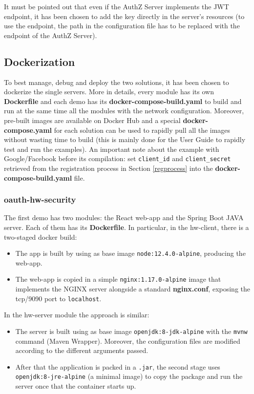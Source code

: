 \documentclass[a4paper,12pt]{article}
\begin{document}
It must be pointed out that even if the AuthZ Server implements the JWT endpoint, it has been chosen to add the key directly in the server's resources (to use the endpoint, the path in the configuration file has to be replaced with the endpoint of the AuthZ Server).

\subsection{Dockerization}
To best manage, debug and deploy the two solutions, it has been chosen to dockerize the single servers. More in details, every module has its own \textbf{Dockerfile} and each demo has its \textbf{docker-compose-build.yaml} to build and run at the same time all the modules with the network configuration. Moreover, pre-built images are available on Docker Hub and a special \textbf{docker-compose.yaml} for each solution can be used to rapidly pull all the images without wasting time to build (this is mainly done for the User Guide to rapidly test and run the examples).
An important note about the example with Google/Facebook before its compilation: set \texttt{client\_id} and \texttt{client\_secret} retrieved from the registration process in Section \ref{regprocess} into the \textbf{docker-compose-build.yaml} file.

\subsubsection{oauth-hw-security}
The first demo has two modules: the React web-app and the Spring Boot JAVA server. Each of them has its \textbf{Dockerfile}. In particular, in the hw-client, there is a two-staged docker build:

\begin{itemize}
    \item The app is built by using as base image \texttt{node:12.4.0-alpine}, producing the web-app.
    \item The web-app is copied in a simple \texttt{nginx:1.17.0-alpine} image that implements the NGINX server alongside a standard \textbf{nginx.conf}, exposing the tcp/9090 port to \texttt{localhost}.
\end{itemize}

In the hw-server module the approach is similar:

\begin{itemize}
    \item The server is built using as base image \texttt{openjdk:8-jdk-alpine} with the \texttt{mvnw} command (Maven Wrapper). Moreover, the configuration files are modified according to the different arguments passed.
    \item After that the application is packed in a \texttt{.jar}, the second stage uses \texttt{openjdk:8-jre-alpine} (a minimal image) to copy the package and run the server once that the container starts up.
\end{itemize}
\end{document}
